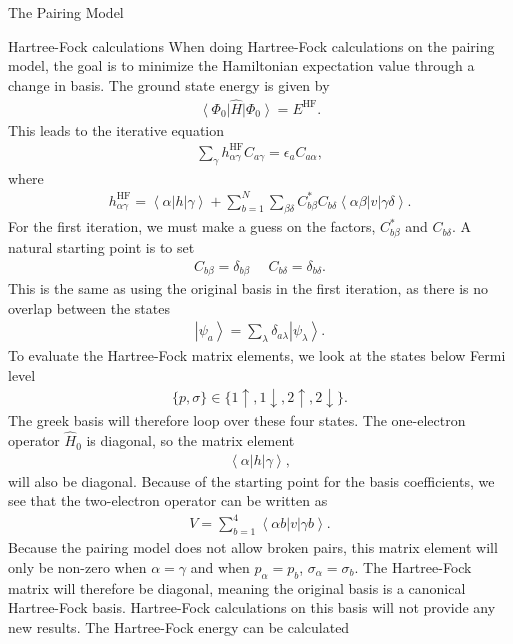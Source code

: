 \documentclass[twoside,english]{uiofysmaster}
\begin{document}
\begin{chapter}{The Pairing Model}
	\begin{section}{Hartree-Fock calculations}
		When doing Hartree-Fock calculations on the pairing model, the goal is to minimize the Hamiltonian expectation value through a change in basis. The ground state energy is given by 
		\begin{align}
			\left< \Phi_0 \right| \hat H \left| \Phi_0 \right> = E^{\text{HF}}.
		\end{align}
		This leads to the iterative equation 
		\begin{align}
  			\sum_{\gamma} h_{\alpha \gamma}^{\text{HF}} C_{a \gamma} = \epsilon_{a} C_{a \alpha},
  		\end{align}
  		where 
  		\begin{align}
  			h_{\alpha \gamma}^{\text{HF}} = \left< \alpha \right| h \left| \gamma \right> + \sum_{b=1}^N \sum_{\beta \delta} C_{b \beta}^* C_{b \delta} \left< \alpha \beta \right| v \left| \gamma \delta \right> .
  		\end{align}
  		For the first iteration, we must make a guess on the factors, $C_{b \beta}^*$ and $C_{b \delta}$. A natural starting point is to set
  		\begin{align}
  			C_{b \beta} = \delta_{b \beta} \:\:\:\:\:\: C_{b \delta} = \delta_{b \delta}.
  		\end{align}
  		This is the same as using the original basis in the first iteration, as there is no overlap between the states
  		\begin{align}
  			\left| \psi_a \right> = \sum_ \lambda \delta_{a \lambda} \left| \psi_ \lambda \right> .
  		\end{align}
  		To evaluate the Hartree-Fock matrix elements, we look at the states below Fermi level 
  		\begin{align}
  			\{p, \sigma\} \in \{ 1 \uparrow, 1 \downarrow, 2 \uparrow, 2 \downarrow \}.
  		\end{align}
  		The greek basis will therefore loop over these four states. The one-electron operator $\hat H_0$ is diagonal, so the matrix element
  		\begin{align}
  			\left< \alpha | h | \gamma \right> ,
  		\end{align}
 		will also be diagonal. Because of the starting point for the basis coefficients, we see that the two-electron operator can be written as
 		\begin{align}
 			V = \sum_{ b = 1 }^4 \left< \alpha b | v | \gamma b \right> .
 		\end{align}
 		Because the pairing model does not allow broken pairs, this matrix element will only be non-zero when $\alpha = \gamma$ and when $p_{\alpha} = p_{b}$, $\sigma_ \alpha = \sigma_b$. The Hartree-Fock matrix will therefore be diagonal, meaning the original basis is a canonical Hartree-Fock basis. Hartree-Fock calculations on this basis will not provide any new results. The Hartree-Fock energy can be calculated

\end{section}
\end{chapter}
\end{document}
